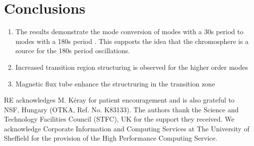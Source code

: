 \documentclass{aa}
\begin{document}

\section{Conclusions}

   \begin{enumerate}
      \item The results demonstrate the mode conversion of modes with a 30s period to modes with a 180s period \cite{leibacher1982}. This supports the idea that the chromosphere is a source for the 180s period oscillations.
      \item Increased transition region structuring is observed for the higher order modes
      \item Magnetic flux tube enhance the structruring in the transition zone
   \end{enumerate}

\begin{acknowledgements}
RE acknowledges M. K\'eray for patient encouragement and is also grateful to NSF, Hungary (OTKA, Ref. No. K83133). 
The authors thank the Science and Technology Facilities Council (STFC), UK for the support they received. We acknowledge Corporate Information and Computing Services at The University of Sheffield for the provision of the High Performance Computing Service.
\end{acknowledgements}


\end{document}
